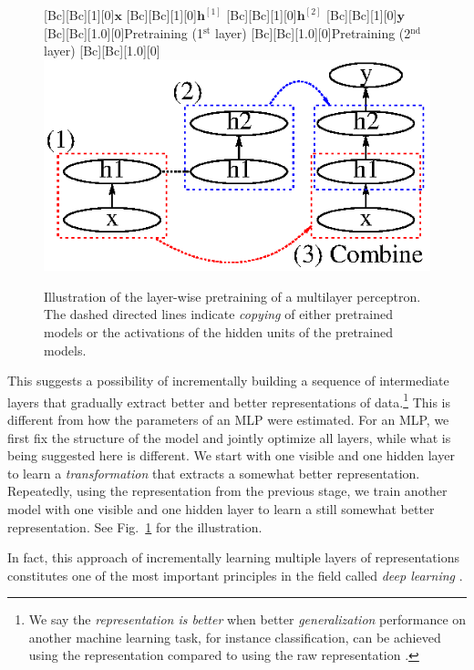 \documentclass[dissertation,nocontribution]{aaltoseries}
\newcommand{\qlay}[1]{\left[#1\right]}
\newcommand{\vect}[1]{\mathbf{#1}}
\newcommand{\vh}[0]{\vect{h}}
\newcommand{\vx}[0]{\vect{x}}
\newcommand{\vy}[0]{\vect{y}}
\begin{document}
\begin{figure}[t]
    \centering
    [Bc][Bc][1][0]{$\vx$}
    [Bc][Bc][1][0]{$\vh^{\qlay{1}}$}
    [Bc][Bc][1][0]{$\vh^{\qlay{2}}$}
    [Bc][Bc][1][0]{$\vy$}
    [Bc][Bc][1.0][0]{Pretraining
    (1$^\text{st}$ layer)}
    [Bc][Bc][1.0][0]{Pretraining
    (2$^\text{nd}$ layer)}
    [Bc][Bc][1.0][0]{}
    \includegraphics[width=0.7\columnwidth]{figures/pretrain_mlp.eps}
    \caption{Illustration of the layer-wise pretraining of
    a multilayer perceptron. The dashed directed lines
    indicate \textit{copying} of either pretrained models or
    the activations of the hidden units of the pretrained
    models.}
    \label{fig:incr_feat}
\end{figure}

This suggests a possibility of incrementally building a
sequence of intermediate layers that gradually extract
better and better representations of data.\footnote{We say
the \textit{representation is better} when better
\textit{generalization} performance on another machine
learning task, for instance classification, can be achieved
using the representation compared to using the raw
representation \citep{Bengio2007nips}.} This is different
from
how the parameters of an MLP were estimated. For an MLP, we
first fix the structure of the model and jointly optimize
all layers, while what is being suggested here is different. We start with one visible and one hidden
layer to learn a \textit{transformation} that extracts a
somewhat better representation. Repeatedly, using the
representation from the previous stage, we train another
model with one visible and one hidden layer to learn a
still somewhat
better representation. See Fig.~\ref{fig:incr_feat}
for the illustration.

In fact, this approach of incrementally learning multiple
layers of representations constitutes one of the most important
principles in the field called \textit{deep learning}
\citep[see, e.g.,][]{Bengio2009a}.
\end{document}
